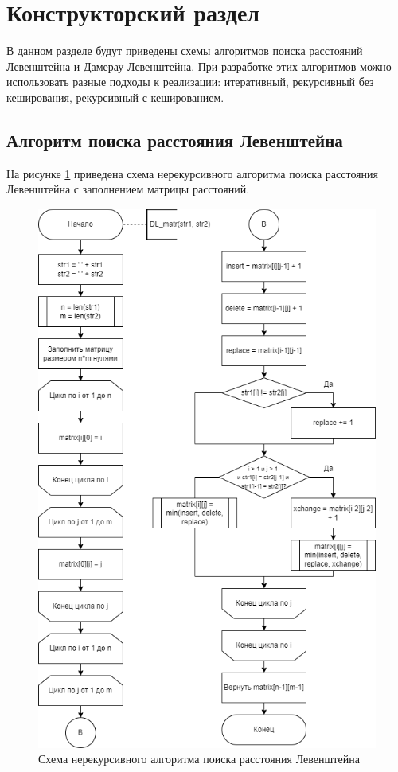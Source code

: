 \section{Конструкторский раздел \hfill}
\vspace{\baselineskip}

В данном разделе будут приведены схемы алгоритмов поиска расстояний Левенштейна и Дамерау-Левенштейна. При разработке этих алгоритмов можно использовать разные подходы к реализации: итеративный, рекурсивный без кеширования, рекурсивный с кешированием.

\subsection{Алгоритм поиска расстояния Левенштейна}

На рисунке \ref{fig:l-matr} приведена схема нерекурсивного алгоритма поиска расстояния Левенштейна с заполнением матрицы расстояний.

\newpage
\begin{figure}[h!btp]
    \captionsetup{justification=centering}
	\centering
	\includegraphics[width=360pt]{inc/dl-matr.png}
	\caption{Схема нерекурсивного алгоритма поиска расстояния Левенштейна}
	\label{fig:l-matr}	
\end{figure}
\clearpage

